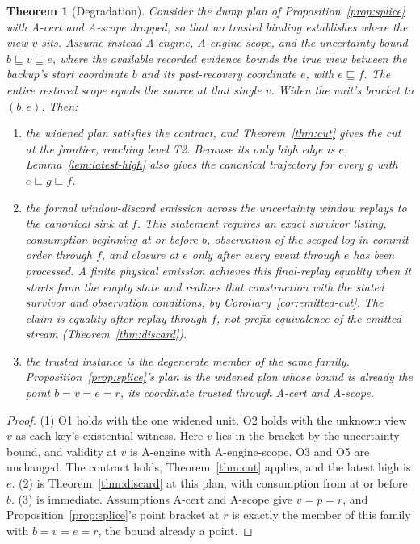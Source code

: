 \documentclass[sigconf,nonacm,10pt]{acmart}
\theoremstyle{plain}
\newtheorem{theorem}{Theorem}
\theoremstyle{definition}
\newcommand{\pre}{\sqsubseteq}                   %
\begin{document}
\begin{theorem}[Degradation]\label{thm:degrade}
Consider the dump plan of Proposition~\ref{prop:splice} with
A-cert and A-scope dropped, so that no trusted binding establishes where
the view $v$ sits. Assume instead A-engine, A-engine-scope, and the
\emph{uncertainty bound} $b \pre v \pre e$, where the available recorded
evidence bounds the true view between the backup's start coordinate
$b$ and its post-recovery coordinate $e$, with $e \pre f$. The entire
restored scope equals the source at that single $v$. Widen the unit's bracket to
$(b, e)$. Then:
\begin{enumerate}
\item the widened plan satisfies the contract, and
Theorem~\ref{thm:cut} gives the cut at the frontier, reaching level T2.
Because its only high edge is $e$, Lemma~\ref{lem:latest-high} also
gives the canonical trajectory for every $g$ with
$e \pre g \pre f$.
\item the formal window-discard emission across the uncertainty
window replays to the canonical sink at $f$. This statement requires
an exact survivor listing, consumption beginning at or before $b$,
observation of the scoped log in commit order through $f$, and closure
at $e$ only after every event through $e$ has been processed. A
finite physical emission achieves this final-replay equality when it
starts from the empty state and realizes that construction with the
stated survivor and observation conditions, by
Corollary~\ref{cor:emitted-cut}. The claim is equality after replay
through $f$, not prefix equivalence of the emitted stream
(Theorem~\ref{thm:discard}).
\item the trusted instance is the degenerate member of the same
family. Proposition~\ref{prop:splice}'s plan is the widened plan
whose bound is already the point $b = v = e = r$, its coordinate
trusted through A-cert and A-scope.
\end{enumerate}
\end{theorem}

\begin{proof}
(1) O1 holds with the one widened unit. O2 holds with the unknown
view $v$ as each key's existential witness. Here $v$ lies in the
bracket by the uncertainty bound, and validity at $v$ is A-engine
with A-engine-scope. O3 and O5 are unchanged. The contract holds,
Theorem~\ref{thm:cut} applies, and the latest high is $e$. (2) is
Theorem~\ref{thm:discard} at this plan, with consumption from at
or before $b$. (3) is immediate. Assumptions A-cert and A-scope give $v = p = r$, and
Proposition~\ref{prop:splice}'s point bracket at $r$ is exactly
the member of this family with $b = v = e = r$, the bound already
a point.
\end{proof}
\end{document}

